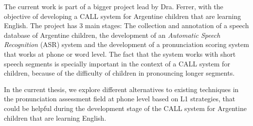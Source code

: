
The current work is part of a bigger project lead by Dra. Ferrer, with the objective
of developing a CALL system for Argentine children that are learning English.
The project has 3 main stages: The collection and annotation of a speech database
of Argentine children, the development of an \textit{Automatic Speech Recognition} (ASR) system and the development of a pronunciation scoring system that works at phone or word
level. The fact that the system works with short speech segments is specially important in
the context of a CALL system for children, because of the difficulty of children in
pronouncing longer segments.

In the current thesis, we explore different alternatives to existing techniques in the
pronunciation assessment field at phone level based on L1 strategies, that could be helpful
during the development stage of the CALL system for Argentine children that are learning English.
